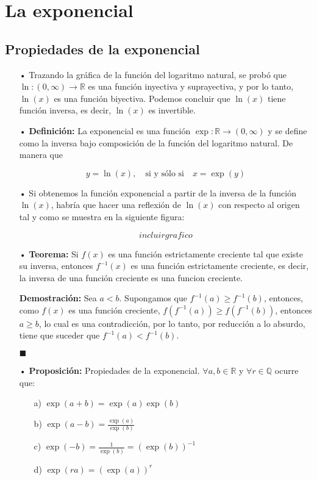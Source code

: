 \documentclass[pts12]{article}
\numberwithin{equation}{section}
\newcommand{\Col}{\color{ProcessBlue}}
\begin{document}
\newpage

\section{\Col La exponencial} 

\subsection{\Col Propiedades de la exponencial}

\begin{itemize}

\item[\Col •] Trazando la gráfica de la función del logaritmo natural, se probó que $\ln:(0,\infty)\longrightarrow\mathbb{R}$ es una función inyectiva y suprayectiva, y por lo tanto, $\ln(x)$ es una función biyectiva. Podemos concluir que $\ln(x)$ tiene función inversa, es decir, $\ln(x)$ es invertible.

\item[\Col •] \textbf{Definición:} La exponencial es una función $\exp:\mathbb{R}\longrightarrow (0,\infty)$ y se define como la inversa bajo composición de la función del logaritmo natural. De manera que 

$$ y=\ln(x), \quad \mbox{si y sólo si} \quad x=\exp(y)$$ 

\item[\Col •] Si obtenemos la función exponencial a partir de la inversa de la función $\ln(x)$, habría que hacer una reflexión de $\ln(x)$ con respecto al origen tal y como se muestra en la siguiente figura:

$$ incluirgrafico $$ 

\item[\Col •] \textbf{Teorema:} Si $f(x)$ es una función estrictamente creciente tal que existe su inversa, entonces $f^{-1}(x)$ es una función estrictamente creciente, es decir, la inversa de una función creciente es una funcion creciente.

\textbf{Demostración:} Sea $a<b$. Supongamos que $f^{-1}(a)\geq f^{-1}(b)$, entonces, como $f(x)$ es una función creciente, $f(f^{-1}(a))\geq f(f^{-1}(b))$, entonces $a\geq b$, lo cual es una contradicción, por lo tanto, por reducción a lo absurdo, tiene que suceder que $f^{-1}(a)<f^{-1}(b)$.

\begin{flushright}
$\blacksquare$
\end{flushright} 

\item[\Col •] \textbf{Proposición:} Propiedades de la exponencial. $\forall a,b\in\mathbb{R}$ y $\forall r\in\mathbb{Q}$ ocurre que:
\begin{enumerate}
\item[a)] $\exp(a+b)=\exp(a)\exp(b)$
\item[b)] $\exp(a-b)=\frac{\exp(a)}{\exp(b)}$
\item[c)] $\exp(-b)=\frac{1}{\exp(b)}=(\exp(b))^{-1}$
\item[d)] $\exp(ra)=(\exp(a))^r$
\end{enumerate}


\end{itemize}
\end{document}
